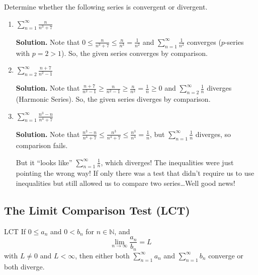\begin{Example}{}{}
    Determine whether the following series is convergent or divergent.
    \begin{enumerate}[label=(\roman*)]
        \item $ \displaystyle \sum\limits_{n=1}^{\infty} \frac{n}{n^3+7} $

              \textbf{Solution.}
              Note that
              $ \displaystyle 0\leqslant \frac{n}{n^3+7} \leqslant \frac{n}{n^3}=\frac{1}{n^2} $
              and $ \displaystyle \sum\limits_{n=1}^{\infty} \frac{1}{n^2} $ converges
              ($ p $-series with $ p=2>1 $).
              So, the given series converges by comparison.
        \item $ \displaystyle \sum\limits_{n=2}^{\infty} \frac{n+7}{n^2-1}  $

              \textbf{Solution.}
              Note that
              $ \displaystyle \frac{n+7}{n^2-1} \geqslant \frac{n}{n^2-1} \geqslant \frac{n}{n^2} =\frac{1}{n}
                  \geqslant 0 $
              and $ \displaystyle \sum\limits_{n=2}^{\infty} \frac{1}{n} $ diverges (Harmonic Series).
              So, the given series diverges by comparison.
        \item $ \displaystyle \sum\limits_{n=1}^{\infty} \frac{n^3-n}{n^4+7}  $

              \textbf{Solution.}
              Note that
              $ \displaystyle \frac{n^3-n}{n^4+7} \leqslant \frac{n^3}{n^4+7}\leqslant \frac{n^3}{n^4} =\frac{1}{n} $,
              but $ \displaystyle \sum\limits_{n=1}^{\infty} \frac{1}{n}  $ diverges, so comparison fails.

              But it ``looks like'' $ \displaystyle \sum\limits_{n=1}^{\infty} \frac{1}{n} $, which diverges!
              The inequalities were just pointing the wrong way! If only there was a test that didn't require
              us to use inequalities but still allowed us to compare two series\dots Well good news!
    \end{enumerate}
\end{Example}

\subsection*{The Limit Comparison Test (LCT)}
\begin{Theorem}{LCT}{}
    If $ 0\leqslant a_n $ and $ 0<b_n $ for $ n\in\mathbb{N} $, and
    \[ \lim\limits_{{n} \to {\infty}} \frac{a_n}{b_n} =L \]
    with $ L\neq 0 $ and $ L<\infty $, then either both $ \sum\limits_{n=1}^{\infty} a_n $
    and $ \sum\limits_{n=1}^{\infty} b_n $ converge or both diverge.
\end{Theorem}

